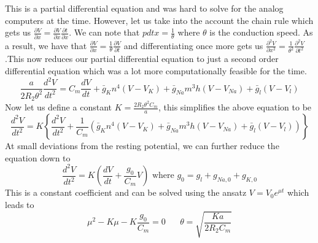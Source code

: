 \documentclass{article}
\newcommand{\pd}[2]{\frac{\partial #1}{\partial #2}}
\newcommand{\od}[2]{\frac{d #1}{d #2}}
\newcommand{\pdt}[2]{\frac{\partial ^2 #1}{\partial #2 ^2}}
\newcommand{\odt}[2]{\frac{d^2 #1}{d #2 ^2}}
\numberwithin{equation}{section}
\begin{document}
This is a partial differential equation and was hard to solve for the analog computers at the time. However, let us take into the account the chain rule which gets us $\pd{V}{x} = \pd{V}{x} \pd{t}{x}$. We can note that $pd{t}{x} = \frac{1}{\theta}$ where $\theta$ is the conduction speed. As a result, we have that $\pd{V}{x} = \frac{1}{\theta} \pd{V}{t}$ and differentiating once more gets us $\pdt{V}{x} = \frac{1}{\theta^2}\pdt{V}{t}$.This now reduces our partial differential equation to just a second order differential equation which was a lot more computationally feasible for the time. 
\begin{equation}
    \frac{a}{2R_2 \theta^2} \odt{V}{t} = C_m \od{V}{t} +\bar{g}_Kn^4(V-V_K) +\bar{g}_{Na}m^3h(V-V_{Na})+\bar{g}_l(V-V_l) 
\end{equation}
Now let us define a constant $K = \frac{2R_2 \theta^2 C_m}{a}$, this simplifies the above equation to be 
\begin{equation}
    \odt{V}{t} = K\left\{\odt{V}{t} +\frac{1}{C_m} \left( \bar{g}_Kn^4(V-V_K) +\bar{g}_{Na}m^3h(V-V_{Na})+\bar{g}_l(V-V_l) \right) \right\}
\end{equation}
At small deviations from the resting potential, we can further reduce the equation down to 
\begin{equation}
    \odt{V}{t} = K\left( \od{V}{t} + \frac{g_0}{C_m}V \right) \text{ where } g_0 = g_l + g_{Na,0} + g_{K,0}
\end{equation}
This is a constant coefficient and can be solved using the ansatz $V= V_0 e^{\mu t}$ which leads to
\begin{equation}
    \mu ^2 - K\mu - K\frac{g_0}{C_m} = 0 \hspace{20pt} \theta = \sqrt{\frac{Ka}{2R_2 C_m}}
\end{equation}

\newpage
\end{document}
